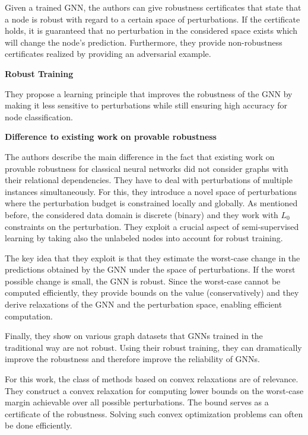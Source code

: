 \documentclass[a4paper,preprint]{sig-alternate}
\begin{document}
Given a trained GNN, the authors can give robustness certificates that state that a
node is robust with regard to a certain space of perturbations. If the certificate
holds, it is guaranteed that no perturbation in the considered space exists
which will change the node's prediction. Furthermore, they provide non-robustness
certificates realized by providing an adversarial example.\newline

\textbf{Robust Training}\newline

They propose a learning principle that improves the robustness of the GNN
by making it less sensitive to perturbations while still ensuring high
accuracy for node classification.\newline

\textbf{Difference to existing work on provable robustness}\newline

The authors describe the main difference in the fact that existing work on provable robustness for classical neural networks
did not consider graphs with their relational dependencies. They have to deal with perturbations of multiple instances simultaneously.
For this, they introduce a novel space of perturbations where the perturbation budget is constrained locally and globally.
As mentioned before, the considered data domain is discrete (binary) and they work with $L_0$ constraints on the perturbation.
They exploit a crucial aspect of semi-supervised learning by taking also the unlabeled nodes into account for robust training.\newline

The key idea that they exploit is that they estimate the worst-case change in the predictions obtained by the GNN under
the space of perturbations. If the worst possible change is small, the GNN is robust. Since the worst-case cannot be computed
efficiently, they provide bounds on the value (conservatively) and they derive relaxations of the GNN and the perturbation space, 
enabling efficient computation.\newline

Finally, they show on various graph datasets that GNNs trained in the traditional way are not robust. Using their robust training, 
they can dramatically improve the robustness and therefore improve the reliability of GNNs.\newline

For this work, the class of methods based on convex relaxations are of relevance. They construct a convex relaxation for computing 
lower bounds on the worst-case margin achievable over all possible perturbations. The bound serves as a certificate of the robustness.
Solving such convex optimization problems can often be done efficiently.\newline
\end{document}
